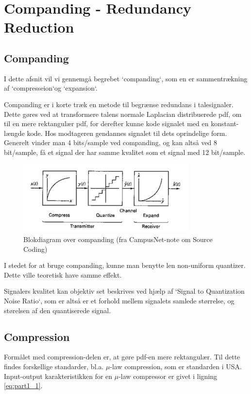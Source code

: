 \chapter{Companding - Redundancy Reduction}
\label{ch:part1}

\section{Companding}
I dette afsnit vil vi gennemgå begrebet `companding`, som en er sammentrækning af `compresseion`og `expansion`. 

Companding er i korte træk en metode til begrænse redundans i talesignaler. Dette gøres ved at transformere talens normale Laplacian distribuerede pdf, om til en mere rektangulær pdf, for derefter kunne kode signalet med en konstant-længde kode. Hos modtageren gendannes signalet til dets oprindelige form. Generelt vinder man 4 bits/sample ved companding, og kan altså ved 8 bit/sample, få et signal der har samme kvalitet som et signal med 12 bit/sample. 

\begin{figure}[!ht]
	\centering
	\includegraphics[width=0.8\textwidth]{resources/part1_compand_quant_expand}
 	\caption{Blokdiagram over companding (fra CampusNet-note om Source Coding)}
 	\label{fig:part1_1}
\end{figure}

I stedet for at bruge companding, kunne man benytte len non-uniform quantizer. Dette ville teoretisk have samme effekt.

Signalers kvalitet kan objektiv set beskrives ved hjælp af `Signal to Quantization Noise Ratio`, som er altså er et forhold mellem signalets samlede størrelse, og størelsen af den quantiserede signal. 



\section{Compression}
Formålet med compression-delen er, at gøre pdf-en mere rektangulær. Til dette findes forskellige standarder, bl.a. $\mu$-law compression, som er standarden i USA. Input-output karakteristikken for en $\mu$-law compressor er givet i ligning \ref{eq:part1_1}.

